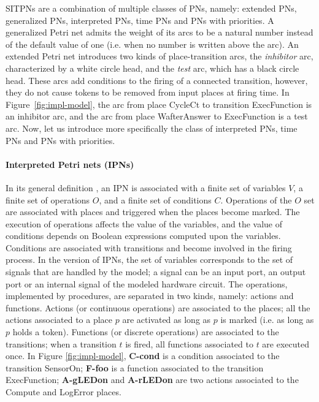 \documentclass[pdflatex,sn-mathphys]{sn-jnl}%
\theoremstyle{thmstyleone}%
\theoremstyle{thmstyletwo}%
\theoremstyle{thmstylethree}%
\begin{document}
SITPNs are a combination of multiple classes of PNs, namely: extended
PNs, generalized PNs, interpreted PNs, time PNs and PNs with
priorities. A generalized Petri net admits the weight of its arcs to
be a natural number instead of the default value of one (i.e. when no
number is written above the arc). An extended Petri net introduces two
kinds of place-transition arcs, the \textit{inhibitor} arc,
characterized by a white circle head, and the \textit{test} arc, which
has a black circle head. These arcs add conditions to the firing of a
connected transition, however, they do not cause tokens to be removed
from input places at firing time. In Figure~\ref{fig:impl-model}, the
arc from place CycleCt to transition ExecFunction is an inhibitor arc,
and the arc from place WafterAnswer to ExecFunction is a test arc.
Now, let us introduce more specifically the class of interpreted PNs,
time PNs and PNs with priorities.

\paragraph{Interpreted Petri nets (IPNs)}
In its general definition \cite{David1994}, an IPN is associated with
a finite set of variables $V$, a finite set of operations $O$, and a
finite set of conditions $C$. Operations of the $O$ set are associated
with places and triggered when the places become marked. The execution
of operations affects the value of the variables, and the value of
conditions depends on Boolean expressions computed upon the variables.
Conditions are associated with transitions and become involved in the
firing process.  In the \hilecop{} version of
IPNs, %
the set of variables corresponds to the set of \vhdl{} signals that
are handled by the model; a signal can be an input port, an output
port or an internal signal of the modeled hardware circuit. The
operations, implemented by \vhdl{} procedures, are separated in two
kinds, namely: actions and functions. Actions (or continuous
operations) are associated to the places; all the actions associated
to a place $p$ are activated as long as $p$ is marked (i.e. as long as
$p$ holds a token). Functions (or discrete operations) are associated
to the transitions; when a transition $t$ is fired, all functions
associated to $t$ are executed once. In Figure \ref{fig:impl-model},
\textbf{C-cond} is a condition associated to the transition SensorOn;
\textbf{F-foo} is a function associated to the transition
ExecFunction; \textbf{A-gLEDon} and \textbf{A-rLEDon} are two actions
associated to the Compute and LogError places.
\end{document}
